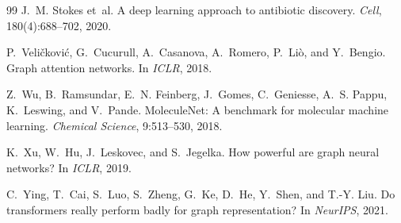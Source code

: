 \documentclass[11pt,a4paper]{article}
\begin{document}
\begin{thebibliography}{99}
J.~M. Stokes et~al.
\newblock A deep learning approach to antibiotic discovery.
\newblock \emph{Cell}, 180(4):688--702, 2020.

P.~Veličković, G.~Cucurull, A.~Casanova, A.~Romero, P.~Liò, and Y.~Bengio.
\newblock Graph attention networks.
\newblock In \emph{ICLR}, 2018.

Z.~Wu, B.~Ramsundar, E.~N. Feinberg, J.~Gomes, C.~Geniesse, A.~S. Pappu,
  K.~Leswing, and V.~Pande.
\newblock MoleculeNet: A benchmark for molecular machine learning.
\newblock \emph{Chemical Science}, 9:513--530, 2018.

K.~Xu, W.~Hu, J.~Leskovec, and S.~Jegelka.
\newblock How powerful are graph neural networks?
\newblock In \emph{ICLR}, 2019.

C.~Ying, T.~Cai, S.~Luo, S.~Zheng, G.~Ke, D.~He, Y.~Shen, and T.-Y. Liu.
\newblock Do transformers really perform badly for graph representation?
\newblock In \emph{NeurIPS}, 2021.

\end{thebibliography}
\end{document}
